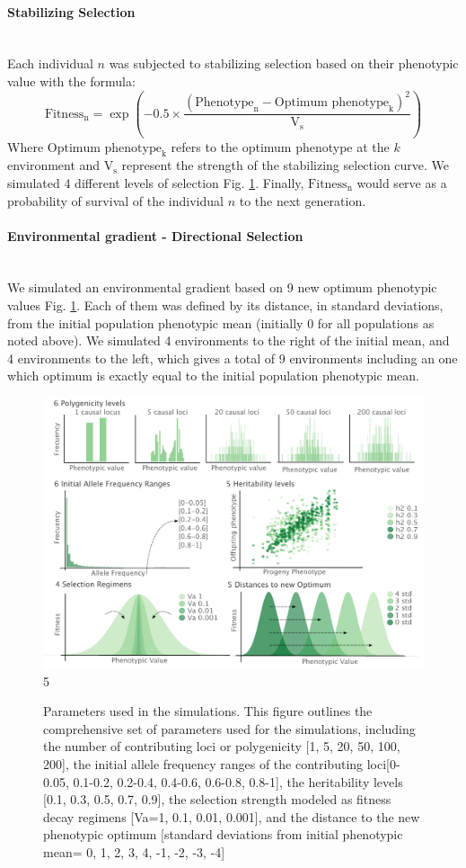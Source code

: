\documentclass{article}
\let\oldparagraph\paragraph
\renewcommand{\paragraph}[1]{\oldparagraph{#1}\mbox{}\\}
\begin{document}
\paragraph{Stabilizing Selection}
Each individual $n$ was subjected to stabilizing selection based on their phenotypic value with the formula:
\[
\text{Fitness}_\text{n} = \exp\left(-0.5 \times \frac{(\text{Phenotype}_\text{n} - {\text{Optimum phenotype}_\text{k}})^2}{\text{V}_\text{s}}\right)
\]
Where $\text{Optimum phenotype}_\text{k}$ refers to the optimum phenotype at the $k$ environment and $\text{V}_\text{s}$ represent the strength of the stabilizing selection curve. We simulated 4 different levels of selection Fig. \ref{fig:parameters}. Finally,  $\text{Fitness}_\text{n}$ would serve as a probability of survival of the individual $n$ to the next generation.

\paragraph{Environmental gradient - Directional Selection}
We simulated an environmental gradient based on 9 new optimum phenotypic values Fig. \ref{fig:parameters}. Each of them was defined by its distance, in standard deviations, from the initial population phenotypic mean (initially 0 for all populations as noted above). We simulated 4 environments to the right of the initial mean, and 4 environments to the left, which gives a total of 9 environments including an one which optimum is exactly equal to the initial population phenotypic mean. 

\begin{figure}[h]
    \centering
    \includegraphics[width=1\textwidth]{figures/parameters.pdf}
    5\captionsetup{font=small} 
    \caption{Parameters used in the simulations. This figure outlines the comprehensive set of parameters used for the simulations, including the number of contributing loci or polygenicity [1, 5, 20, 50, 100, 200], the initial allele frequency ranges of the contributing loci[0-0.05, 0.1-0.2, 0.2-0.4, 0.4-0.6, 0.6-0.8, 0.8-1], the heritability levels [0.1, 0.3, 0.5, 0.7, 0.9], the selection strength modeled as fitness decay regimens [Va=1, 0.1, 0.01, 0.001], and the distance to the new phenotypic optimum [standard deviations from initial phenotypic mean= 0, 1, 2, 3, 4, -1, -2, -3, -4]}
    \label{fig:parameters}
\end{figure}
\end{document}
